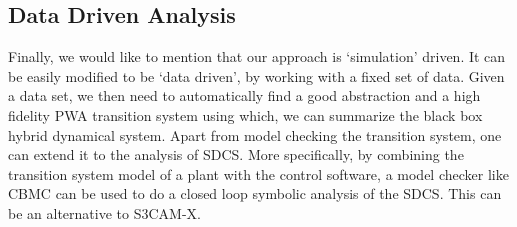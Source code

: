 \subsection{Data Driven Analysis}

Finally, we would like to mention that our approach is `simulation'
driven. It can be easily modified to be `data driven', by working with
a fixed set of data. Given a data set, we then need to automatically
find a good abstraction and a high fidelity PWA transition system
using which, we can summarize the black box hybrid dynamical system.
Apart from model checking the transition system, one can extend it to
the analysis of SDCS. More specifically, by combining the transition
system model of a plant with the control software, a model checker
like CBMC \cite{kroening2014cbmc} can be used to do a closed loop
symbolic analysis of the SDCS. This can be an alternative to S3CAM-X.

